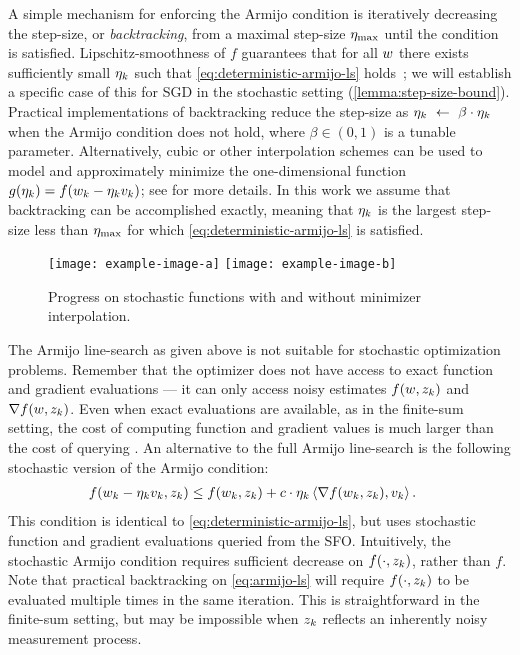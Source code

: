 A simple mechanism for enforcing the Armijo condition is iteratively decreasing the step-size, or \emph{backtracking}, from a maximal step-size \( \eta_{\text{max}} \) until the condition is satisfied.
Lipschitz-smoothness of \( f \) guarantees that for all \( w \) there exists sufficiently small \( \eta_k \) such that \autoref{eq:deterministic-armijo-ls} holds~\citep{nocedal1999numerical}; we will establish a specific case of this for \ac{SGD} in the stochastic setting (\autoref{lemma:step-size-bound}). 
Practical implementations of backtracking reduce the step-size as \( \eta_k~\gets~\beta \cdot \eta_k \) when the Armijo condition does not hold, where \( \beta \in (0,1) \) is a tunable parameter. 
Alternatively, cubic or other interpolation schemes can be used to model and approximately minimize the one-dimensional function \( g(\eta_k) = f(w_k - \eta_k v_k) \); see \citet{nocedal1999numerical} for more details.
In this work we assume that backtracking can be accomplished exactly, meaning that \( \eta_k \) is the largest step-size less than \( \eta_{\text{max}} \) for which \autoref{eq:deterministic-armijo-ls} is satisfied.

\begin{figure}[t]
    \centering
    \texttt{[image: example-image-a]}
    \texttt{[image: example-image-b]}
    \caption{Progress on stochastic functions with and without minimizer interpolation.}%
    \label{fig:interpolation-ls}
\end{figure}

The Armijo line-search as given above is not suitable for stochastic optimization problems.
Remember that the optimizer does not have access to exact function and gradient evaluations --- it can only access noisy estimates \( f(w, z_{k}) \) and \( \nabla f(w, z_{k}) \).
Even when exact evaluations are available, as in the finite-sum setting, the cost of computing function and gradient values is much larger than the cost of querying \oracle{}. 
An alternative to the full Armijo line-search is the following stochastic version of the Armijo condition:
\begin{align}
    f(w_k - \eta_k v_k, z_{k}) &\leq f(w_k, z_{k}) + c \cdot \eta_k \left\langle\nabla f(w_k, z_{k}), v_k\right\rangle. \label{eq:armijo-ls}
\end{align}
This condition is identical to \autoref{eq:deterministic-armijo-ls}, but uses stochastic function and gradient evaluations queried from the \ac{SFO}.
Intuitively, the stochastic Armijo condition requires sufficient decrease on \( f(\cdot, z_{k}) \), rather than \( f \).
Note that practical backtracking on \autoref{eq:armijo-ls} will require \( f(\cdot, z_{k}) \) to be evaluated multiple times in the same iteration.
This is straightforward in the finite-sum setting, but may be impossible when \( z_{k} \) reflects an inherently noisy measurement process. 

